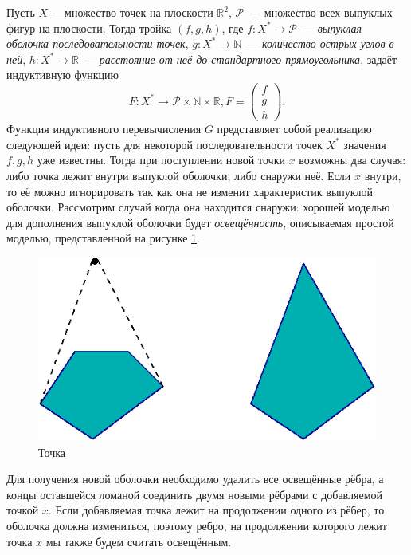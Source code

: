 Пусть $X$~---множество точек на плоскости $\mathbb{R}^2$, $\mathcal{P}$~--- множество всех выпуклых фигур на плоскости. Тогда тройка $(f,g,h)$, где 
$f\colon X^* \rightarrow \mathcal{P}$~--- \emph{выпуклая оболочка последовательности точек}, $g\colon X^* \rightarrow \mathbb{N}$~--- \emph{количество острых углов в ней}, $h\colon X^* \rightarrow \mathbb{R}$~--- \emph{расстояние от неё до стандартного прямоугольника}, задаёт индуктивную функцию $$F\colon X^* \rightarrow \mathcal{P} \times \mathbb{N} \times \mathbb{R}, F = \begin{pmatrix}f\\ g\\ h\end{pmatrix}.$$
Функция индуктивного перевычисления $G$ представляет собой реализацию следующей 
идеи: пусть для некоторой последовательности точек $X^*$ значения $f,g,h$ уже известны. Тогда при поступлении новой точки $x$ возможны два случая: 
либо точка лежит внутри выпуклой оболочки, либо снаружи неё. Если $x$ внутри, то её можно игнорировать так как она не изменит характеристик выпуклой оболочки. Рассмотрим случай когда она находится снаружи: хорошей 
моделью для дополнения выпуклой оболочки будет \emph{освещённость}, 
описываемая простой моделью, представленной на рисунке \ref{fig:conv_light}.
\begin{figure}[ht!]
\begin{center}
\includegraphics[scale=0.6]{images/conv_a_2}
\end{center}
\vspace*{-8mm}
\caption{Точка}\label{fig:conv_light}
\end{figure}

Для получения новой оболочки необходимо удалить все освещённые рёбра, а концы оставшейся ломаной соединить двумя новыми рёбрами с добавляемой точкой $x$.
Если добавляемая точка лежит на продолжении одного из рёбер, то оболочка должна измениться, поэтому ребро, на продолжении которого лежит точка $x$ мы также будем считать освещённым.
\newpage